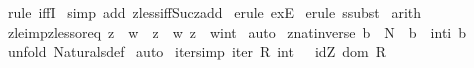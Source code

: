 \begin{isabellebody}
%
\isadelimproof
%
\endisadelimproof
%
\isatagproof
{}\isamarkupfalse%
\ {\isacharparenleft}rule\ iffI{\isacharparenright}\isanewline
{}\isamarkupfalse%
\ {\isacharparenleft}simp\ add{\isacharcolon}\ zless{\isacharunderscore}iff{\isacharunderscore}Suc{\isacharunderscore}zadd{\isacharparenright}\isanewline
{}\isamarkupfalse%
\ {\isacharparenleft}erule\ exE{\isacharparenright}\isanewline
{}\isamarkupfalse%
\ {\isacharparenleft}erule\ ssubst{\isacharparenright}\isanewline
{}\isamarkupfalse%
\ arith\isanewline
{}\isamarkupfalse%
%
\endisatagproof
{\isafoldproof}%
%
\isadelimproof
\isanewline
%
\endisadelimproof
\isanewline
{}\isamarkupfalse%
\ zle{\isacharunderscore}imp{\isacharunderscore}zless{\isacharunderscore}or{\isacharunderscore}eq{\isacharcolon}\ {\isachardoublequoteopen}z\ {\isacharless}{\isacharequal}\ w\ {\isasymLongrightarrow}\ z\ {\isacharless}\ w{\isacharbar}\ z\ {\isacharequal}\ {\isacharparenleft}w{\isacharcolon}{\isacharcolon}int{\isacharparenright}{\isachardoublequoteclose}\isanewline
%
\isadelimproof
%
\endisadelimproof
%
\isatagproof
{}\isamarkupfalse%
\ auto\isanewline
{}\isamarkupfalse%
%
\endisatagproof
{\isafoldproof}%
%
\isadelimproof
\isanewline
%
\endisadelimproof
\isanewline
\isanewline
{}\isamarkupfalse%
\ znat{\isacharunderscore}inverse{\isacharcolon}\ {\isachardoublequoteopen}{\isacharparenleft}b\ {\isasymin}\ {\isacharpercent}N{\isacharparenright}\ {\isacharequal}{\isacharequal}{\isachargreater}\ {\isacharparenleft}b\ {\isacharequal}\ int{\isacharparenleft}{\isachardollar}i\ b{\isacharparenright}{\isacharparenright}{\isachardoublequoteclose}\isanewline
%
\isadelimproof
%
\endisadelimproof
%
\isatagproof
{}\isamarkupfalse%
\ {\isacharparenleft}unfold\ Naturals{\isacharunderscore}def{\isacharparenright}\isanewline
{}\isamarkupfalse%
\ auto\isanewline
{}\isamarkupfalse%
%
\endisatagproof
{\isafoldproof}%
%
\isadelimproof
\isanewline
%
\endisadelimproof
\isanewline
{}\isamarkupfalse%
\ iter{\isacharunderscore}{}{\isacharbrackleft}simp{\isacharbrackright}{\isacharcolon}\ {\isachardoublequoteopen}{\isacharparenleft}iter\ R\ {\isacharparenleft}int\ {}{\isacharparenright}{\isacharparenright}\ {\isacharequal}\ {\isacharparenleft}idZ\ {\isacharparenleft}dom\ R{\isacharparenright}{\isacharparenright}{\isachardoublequoteclose}\isanewline
%
\isadelimproof
%
\endisadelimproof
%
\isatagproof
{}\isamarkupfalse%

\end{isabellebody}
